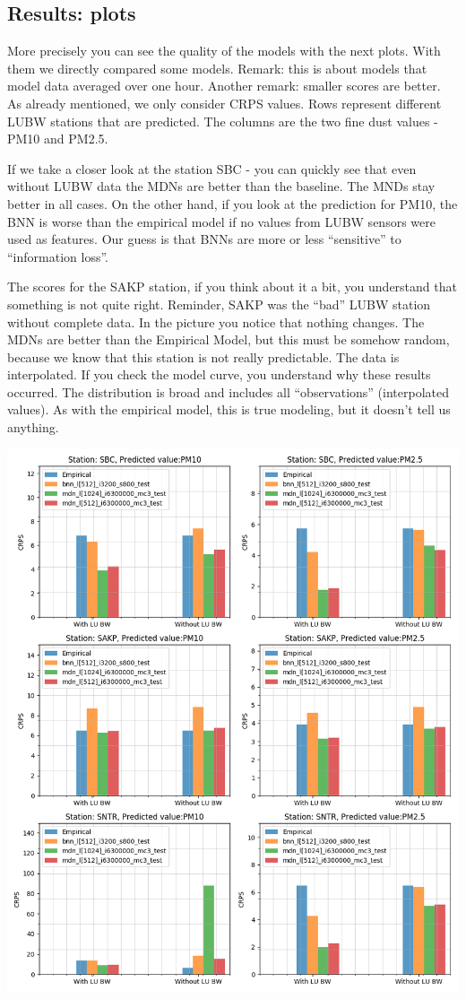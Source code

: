 \documentclass[margin=0.01in]{article}
\begin{document}
\subsection{Results: plots}
\label{sec:org68f9483}

More precisely you can see the quality of the models with the next plots. With them we directly compared some models. Remark: this is about models that model data averaged over one hour. Another remark: smaller scores are better. As already mentioned, we only consider CRPS values. Rows represent different LUBW stations that are predicted. The columns are the two fine dust values - PM10 and PM2.5.

If we take a closer look at the station SBC - you can quickly see that even without LUBW data the MDNs are better than the baseline. The MNDs stay better in all cases. On the other hand, if you look at the prediction for PM10, the BNN is worse than the empirical model if no values from LUBW sensors were used as features. Our guess is that BNNs are more or less ``sensitive'' to ``information loss''.

The scores for the SAKP station, if you think about it a bit, you understand that something is not quite right. Reminder, SAKP was the ``bad'' LUBW station without complete data. In the picture you notice that nothing changes. The MDNs are better than the Empirical Model, but this must be somehow random, because we know that this station is not really predictable. The data is interpolated. If you check the model curve, you understand why these results occurred. The distribution is broad and includes all ``observations'' (interpolated values). As with the empirical model, this is true modeling, but it doesn't tell us anything.

\begin{center}
\includegraphics[width=.9\linewidth]{../images/1h/results_plot_CRPS.png}
\end{center}
\end{document}
